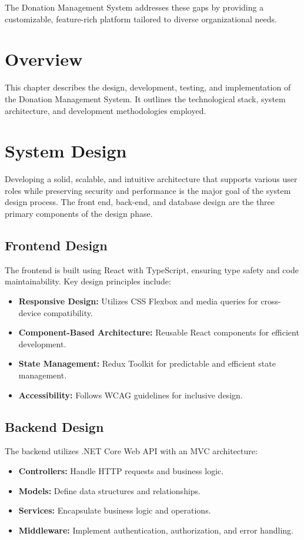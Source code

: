 The Donation Management System addresses these gaps by providing a customizable, feature-rich platform tailored to diverse organizational needs.

\section{Overview}
This chapter describes the design, development, testing, and implementation of the Donation Management System. It outlines the technological stack, system architecture, and development methodologies employed.

\section{System Design}
 Developing a solid, scalable, and intuitive architecture that supports various user roles while
 preserving security and performance is the major goal of the system design process. The front
 end, back-end, and database design are the three primary components of the design phase.

\subsection{Frontend Design}
The frontend is built using React with TypeScript, ensuring type safety and code maintainability. Key design principles include:
\begin{itemize}
    \item \textbf{Responsive Design:} Utilizes CSS Flexbox and media queries for cross-device compatibility.
    \item \textbf{Component-Based Architecture:} Reusable React components for efficient development.
    \item \textbf{State Management:} Redux Toolkit for predictable and efficient state management.
    \item \textbf{Accessibility:} Follows WCAG guidelines for inclusive design.
\end{itemize}

\subsection{Backend Design}
The backend utilizes .NET Core Web API with an MVC architecture:
\begin{itemize}
    \item \textbf{Controllers:} Handle HTTP requests and business logic.
    \item \textbf{Models:} Define data structures and relationships.
    \item \textbf{Services:} Encapsulate business logic and operations.
    \item \textbf{Middleware:} Implement authentication, authorization, and error handling.
\end{itemize}


